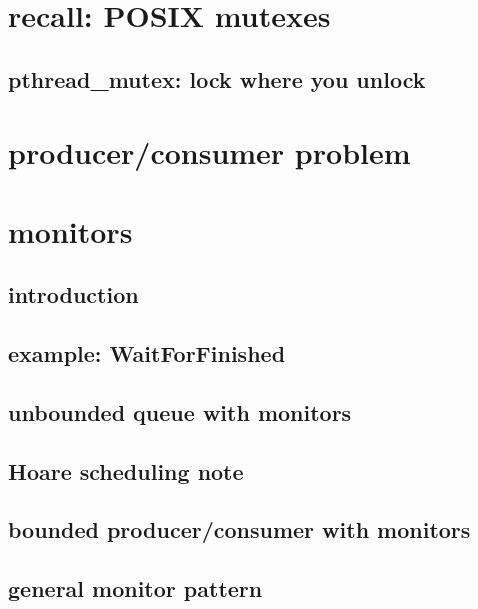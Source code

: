 \section{recall: POSIX mutexes}


\subsection{pthread\_mutex: lock where you unlock}


\section{producer/consumer problem}


\section{monitors}

\subsection{introduction}

\subsection{example: WaitForFinished}


\subsection{unbounded queue with monitors}


\subsection{Hoare scheduling note}


\subsection{bounded producer/consumer with monitors}
 

\subsection{general monitor pattern}


